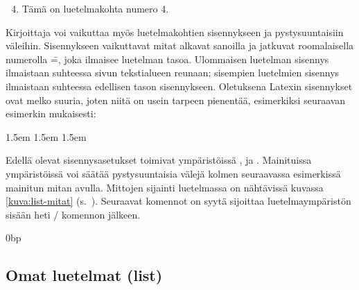 \begin{koodilohkosis}
\begin{enumerate}
  \setcounter{enumi}{3}
\item Tämä on luetelmakohta numero 4.
\end{enumerate}
\end{koodilohkosis}

Kirjoittaja voi vaikuttaa myös luetelmakohtien sisennykseen ja
pystysuuntaisiin väleihin. Sisennykseen vaikuttavat mitat alkavat
sanoilla  ja jatkuvat roomalaisella numerolla
\==, joka ilmaisee luetelman tasoa. Ulommaisen
luetelman sisennys ilmaistaan suhteessa sivun tekstialueen reunaan;
sisempien luetelmien sisennys ilmaistaan suhteessa edellisen tason
sisennykseen. Oletuksena Latexin sisennykset ovat melko suuria, joten
niitä on usein tarpeen pienentää, esimerkiksi seuraavan esimerkin
mukaisesti:

\begin{koodilohkosis}
\setlength{\leftmargini}  {1.5em} %
\setlength{\leftmarginii} {1.5em}
\setlength{\leftmarginiii}{1.5em}
\setlength{\leftmarginiv} {1.5em}
\end{koodilohkosis}

Edellä olevat sisennysasetukset toimivat ympäristöissä
,  ja .
Mainituissa ympäristöissä voi säätää pystysuuntaisia välejä kolmen
seuraavassa esimerkissä mainitun mitan avulla. Mittojen sijainti
luetelmassa on nähtävissä kuvassa \ref{kuva:list-mitat}
(s.~\pageref{kuva:list-mitat}). Seuraavat komennot on syytä sijoittaa
luetelmaympäristön sisään heti \-/ komennon jälkeen.

\begin{koodilohkosis}
\setlength{\parsep} {0bp}   %
\setlength{\itemsep}{3bp}   %
\setlength{\parskip}{1.2ex} %
\end{koodilohkosis}

\subsection{Omat luetelmat (list)}
\label{luku:list-ymparisto}

